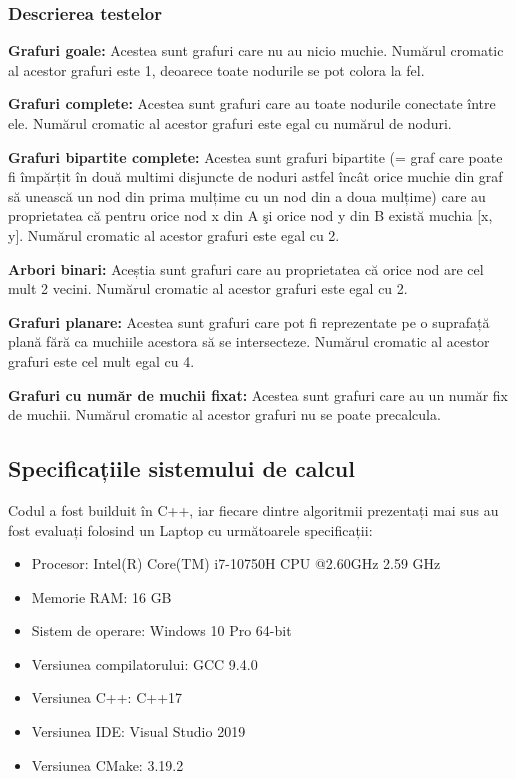 \documentclass[runningheads]{llncs}
\begin{document}
\subsubsection{Descrierea testelor \\}

\textbf{Grafuri goale:} Acestea sunt grafuri care nu au nicio muchie. Numărul cromatic al acestor grafuri este 1, deoarece toate nodurile se pot colora la fel.

\textbf{Grafuri complete:} Acestea sunt grafuri care au toate nodurile conectate
între ele. Numărul cromatic al acestor grafuri este egal cu numărul de noduri.

\textbf{Grafuri bipartite complete:} Acestea sunt grafuri bipartite (=  graf care
poate fi împărțit în două multimi disjuncte
de noduri astfel încât orice muchie din graf să unească un nod din prima mulțime
cu un nod din a doua mulțime) care au proprietatea
că pentru orice nod x din A şi orice nod y din B există muchia [x, y].
Numărul cromatic al acestor grafuri este egal cu 2.

\textbf{Arbori binari:} Aceștia sunt grafuri care au proprietatea că orice nod
are cel mult 2 vecini. Numărul cromatic al acestor grafuri este egal cu 2.

\textbf{Grafuri planare:} Acestea sunt grafuri care pot fi reprezentate pe o
suprafață plană fără ca muchiile acestora să se intersecteze. Numărul cromatic
al acestor grafuri este cel mult egal cu 4.

\textbf{Grafuri cu număr de muchii fixat:} Acestea sunt grafuri care au un număr
fix de muchii. Numărul cromatic al acestor grafuri nu se poate precalcula.


\subsection{Specificațiile sistemului de calcul}
Codul a fost builduit în C++, iar fiecare dintre algoritmii prezentați mai sus au fost
evaluați folosind un Laptop cu următoarele specificații:
\begin{itemize}
\item Procesor: Intel(R) Core(TM) i7-10750H CPU @2.60GHz   2.59 GHz
\item Memorie RAM: 16 GB
\item Sistem de operare: Windows 10 Pro 64-bit
\item Versiunea compilatorului: GCC 9.4.0
\item Versiunea C++: C++17
\item Versiunea IDE: Visual Studio 2019
\item Versiunea CMake: 3.19.2
\end{itemize}
\end{document}
